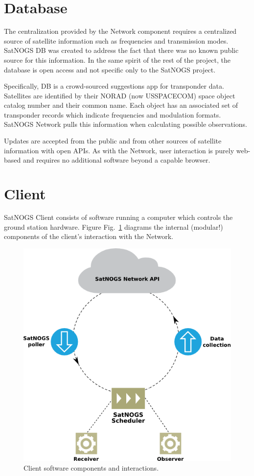\documentclass[conference,12pt]{IEEEtran}
\newcommand{\figref}[1]{Fig.~\ref{#1}}
\newlength{\figwidth}
\begin{document}
\section{Database}
The centralization provided by the Network component requires a centralized source of satellite information such as frequencies and transmission modes.
SatNOGS DB was created to address the fact that there was no known public source for this information.
In the same spirit of the rest of the project, the database is open access and not specific only to the SatNOGS project.

Specifically, DB is a crowd-sourced suggestions app for transponder data.
Satellites are identified by their NORAD (now USSPACECOM) space object catalog number and their common name.
Each object has an associated set of transponder records which indicate frequencies and modulation formats.
SatNOGS Network pulls this information when calculating possible observations.

Updates are accepted from the public and from other sources of satellite information with open APIs.
As with the Network, user interaction is purely web-based and requires no additional software beyond a capable browser.


\section{Client}
SatNOGS Client consists of software running a computer which controls the ground station hardware.
Figure \figref{f:client-flow} diagrams the internal (modular!) components of the client's interaction with the Network.

\begin{figure}[htbp]
\centering
\includegraphics[width=\figwidth]{fig/client-flow}
\caption{Client software components and interactions.}
\label{f:client-flow}
\end{figure}
\end{document}
